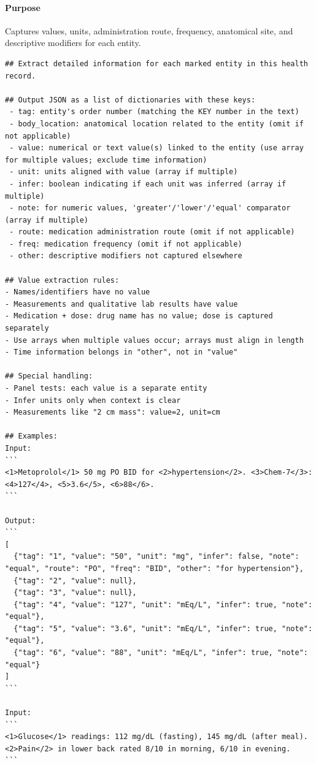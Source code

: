 \paragraph{Purpose} Captures values, units, administration route, frequency, anatomical site, and descriptive modifiers for each entity.
\begin{lstlisting}
## Extract detailed information for each marked entity in this health record.

## Output JSON as a list of dictionaries with these keys:
 - tag: entity's order number (matching the KEY number in the text)
 - body_location: anatomical location related to the entity (omit if not applicable)
 - value: numerical or text value(s) linked to the entity (use array for multiple values; exclude time information)
 - unit: units aligned with value (array if multiple)
 - infer: boolean indicating if each unit was inferred (array if multiple)
 - note: for numeric values, 'greater'/'lower'/'equal' comparator (array if multiple)
 - route: medication administration route (omit if not applicable)
 - freq: medication frequency (omit if not applicable)
 - other: descriptive modifiers not captured elsewhere

## Value extraction rules:
- Names/identifiers have no value
- Measurements and qualitative lab results have value
- Medication + dose: drug name has no value; dose is captured separately
- Use arrays when multiple values occur; arrays must align in length
- Time information belongs in "other", not in "value"

## Special handling:
- Panel tests: each value is a separate entity
- Infer units only when context is clear
- Measurements like "2 cm mass": value=2, unit=cm

## Examples:
Input:
```
<1>Metoprolol</1> 50 mg PO BID for <2>hypertension</2>. <3>Chem-7</3>: <4>127</4>, <5>3.6</5>, <6>88</6>.
```

Output:
```
[
  {"tag": "1", "value": "50", "unit": "mg", "infer": false, "note": "equal", "route": "PO", "freq": "BID", "other": "for hypertension"},
  {"tag": "2", "value": null},
  {"tag": "3", "value": null},
  {"tag": "4", "value": "127", "unit": "mEq/L", "infer": true, "note": "equal"},
  {"tag": "5", "value": "3.6", "unit": "mEq/L", "infer": true, "note": "equal"},
  {"tag": "6", "value": "88", "unit": "mEq/L", "infer": true, "note": "equal"}
]
```

Input:
```
<1>Glucose</1> readings: 112 mg/dL (fasting), 145 mg/dL (after meal). <2>Pain</2> in lower back rated 8/10 in morning, 6/10 in evening.
```


\end{lstlisting}
